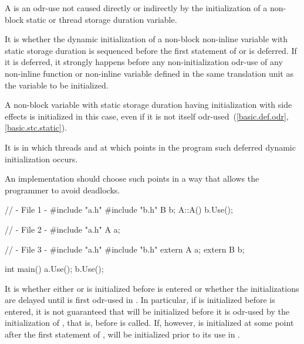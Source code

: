 \pnum
{}%
A 
is an odr-use not caused directly or indirectly by
the initialization of a non-block static or thread storage duration variable.

\pnum
{}%
It is 
whether the dynamic initialization of a
non-block non-inline variable with static storage duration
is sequenced before the first statement of  or is deferred.
If it is deferred, it strongly happens before
any non-initialization odr-use
of any non-inline function or non-inline variable
defined in the same translation unit as the variable to be initialized.
\begin{footnote}
A non-block variable with static storage duration
having initialization
with side effects is initialized in this case,
even if it is not itself odr-used~(\ref{basic.def.odr}, \ref{basic.stc.static}).
\end{footnote}
It is 
in which threads and at which points in the program such deferred dynamic initialization occurs.

\recommended
An implementation should choose such points in a way
that allows the programmer to avoid deadlocks.
\begin{example}
\begin{codeblock}
// - File 1 -
#include "a.h"
#include "b.h"
B b;
A::A() {
  b.Use();
}

// - File 2 -
#include "a.h"
A a;

// - File 3 -
#include "a.h"
#include "b.h"
extern A a;
extern B b;

int main() {
  a.Use();
  b.Use();
}
\end{codeblock}

It is 
whether either  or  is
initialized before  is entered or whether the
initializations are delayed until  is first odr-used in
. In particular, if  is initialized before
 is entered, it is not guaranteed that  will be
initialized before it is odr-used by the initialization of , that
is, before  is called. If, however,  is initialized
at some point after the first statement of ,  will
be initialized prior to its use in .
\end{example}

